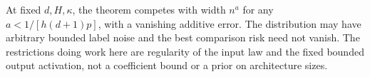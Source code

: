 At fixed $d,H,\kappa$, the theorem competes with width $n^a$ for any $a<1/[h(d+1)p]$, with a vanishing additive error. The distribution may have arbitrary bounded label noise and the best comparison risk need not vanish. The restrictions doing work here are regularity of the input law and the fixed bounded output activation, not a coefficient bound or a prior on architecture sizes.

